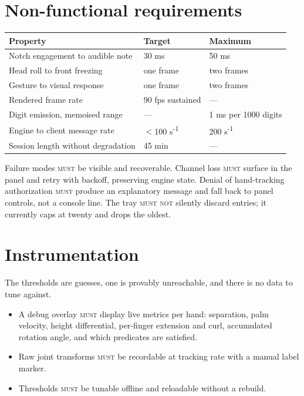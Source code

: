 \documentclass[11pt,a4paper]{article}
\newcommand{\MUST}{\textsc{must}}
\newcommand{\MUSTNOT}{\textsc{must not}}
\theoremstyle{definition}
\theoremstyle{plain}
\theoremstyle{remark}
\begin{document}
\section{Non-functional requirements}

\begin{center}
\begin{tabular}{lll}
\toprule
\textbf{Property} & \textbf{Target} & \textbf{Maximum} \\
\midrule
Notch engagement to audible note & 30 ms & 50 ms \\
Head roll to front freezing & one frame & two frames \\
Gesture to visual response & one frame & two frames \\
Rendered frame rate & 90 fps sustained & --- \\
Digit emission, memoised range & --- & 1 ms per 1000 digits \\
Engine to client message rate & $<$100 s\textsuperscript{-1} & 200 s\textsuperscript{-1} \\
Session length without degradation & 45 min & --- \\
\bottomrule
\end{tabular}
\end{center}

Failure modes \MUST{} be visible and recoverable. Channel loss \MUST{} surface in the panel and
retry with backoff, preserving engine state. Denial of hand-tracking authorization \MUST{} produce
an explanatory message and fall back to panel controls, not a console line. The tray \MUSTNOT{}
silently discard entries; it currently caps at twenty and drops the oldest.

\section{Instrumentation}
\label{sec:instrumentation}

The thresholds are guesses, one is provably unreachable, and there is no data to tune against.

\begin{itemize}[leftmargin=*]
\item A debug overlay \MUST{} display live metrics per hand: separation, palm velocity, height
      differential, per-finger extension and curl, accumulated rotation angle, and which predicates
      are satisfied.
\item Raw joint transforms \MUST{} be recordable at tracking rate with a manual label marker.
\item Thresholds \MUST{} be tunable offline and reloadable without a rebuild.
\end{itemize}
\end{document}
